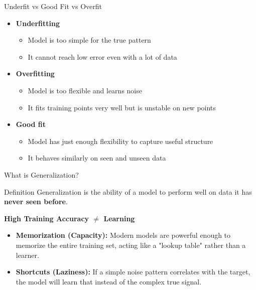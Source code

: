 \begin{frame}{Underfit vs Good Fit vs Overfit}
    \begin{itemize}
        \item \textbf{Underfitting}
        \begin{itemize}
            \item Model is too simple for the true pattern
            \item It cannot reach low error even with a lot of data
        \end{itemize}
        \item \textbf{Overfitting}
        \begin{itemize}
            \item Model is too flexible and learns noise
            \item It fits training points very well but is unstable on new points
        \end{itemize}
        \item \textbf{Good fit}
        \begin{itemize}
            \item Model has just enough flexibility to capture useful structure
            \item It behaves similarly on seen and unseen data
        \end{itemize}
    \end{itemize}
\end{frame}

\begin{frame}{What is Generalization?}

    \begin{block}{Definition}
        Generalization is the ability of a model to perform well on data it has \textbf{never seen before}.
    \end{block}
    
    \vspace{1em}
    
    \textbf{High Training Accuracy $\neq$ Learning}
    \begin{itemize}
        \item \textbf{Memorization (Capacity):} Modern models are powerful enough to memorize the entire training set, acting like a "lookup table" rather than a learner.
        \item \textbf{Shortcuts (Laziness):} If a simple noise pattern correlates with the target, the model will learn that instead of the complex true signal.
    \end{itemize}

\end{frame}


